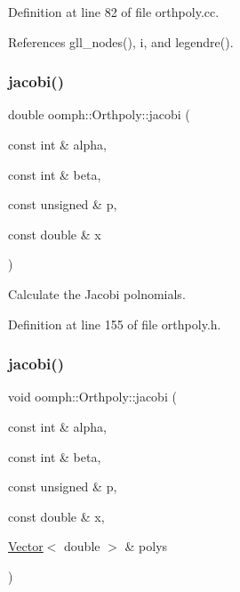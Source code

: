 Definition at line 82 of file orthpoly.\+cc.



References gll\+\_\+nodes(), i, and legendre().

\mbox{\label{namespaceoomph_1_1Orthpoly_ac25d63a7188b81c1462d6cb7f9a99790}} 
\subsubsection{\texorpdfstring{jacobi()}{jacobi()}\hspace{0.1cm}{\footnotesize\ttfamily [1/2]}}
{\footnotesize\ttfamily double oomph\+::\+Orthpoly\+::jacobi (\begin{DoxyParamCaption}\item[{const int \&}]{alpha,  }\item[{const int \&}]{beta,  }\item[{const unsigned \&}]{p,  }\item[{const double \&}]{x }\end{DoxyParamCaption})\hspace{0.3cm}{\ttfamily [inline]}}



Calculate the Jacobi polnomials. 



Definition at line 155 of file orthpoly.\+h.

\mbox{\label{namespaceoomph_1_1Orthpoly_a47ba7dd85f8851622d734e14e883cb9a}} 
\subsubsection{\texorpdfstring{jacobi()}{jacobi()}\hspace{0.1cm}{\footnotesize\ttfamily [2/2]}}
{\footnotesize\ttfamily void oomph\+::\+Orthpoly\+::jacobi (\begin{DoxyParamCaption}\item[{const int \&}]{alpha,  }\item[{const int \&}]{beta,  }\item[{const unsigned \&}]{p,  }\item[{const double \&}]{x,  }\item[{\hyperlink{classoomph_1_1Vector}{Vector}$<$ double $>$ \&}]{polys }\end{DoxyParamCaption})\hspace{0.3cm}{\ttfamily [inline]}}



